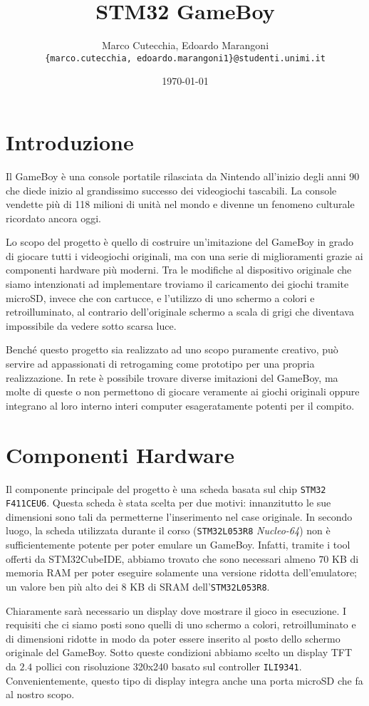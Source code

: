 \documentclass[12pt]{article}
\title{STM32 GameBoy}
\date{\today}
\author{Marco Cutecchia, Edoardo Marangoni \\
\footnotesize \texttt{\{marco.cutecchia, edoardo.marangoni1\}@studenti.unimi.it} \\ }
\begin{document}
\maketitle

\section{Introduzione}
Il GameBoy è una console portatile rilasciata da Nintendo all'inizio degli anni
90 che diede inizio al grandissimo successo dei videogiochi tascabili.
La console vendette più di 118 milioni di unità nel mondo e divenne un fenomeno
culturale ricordato ancora oggi.

Lo scopo del progetto è quello di costruire un'imitazione del GameBoy in grado
di giocare tutti i videogiochi originali, ma con una serie di miglioramenti
grazie ai componenti hardware più moderni.
Tra le modifiche al dispositivo originale che siamo intenzionati ad implementare
troviamo il caricamento dei giochi tramite microSD, invece che con cartucce,
e l'utilizzo di uno schermo a colori e retroilluminato, al contrario dell'originale
schermo a scala di grigi che diventava impossibile da vedere sotto scarsa luce.

Benché questo progetto sia realizzato ad uno scopo puramente creativo, può
servire ad appassionati di retrogaming come prototipo per una propria
realizzazione.
In rete è possibile trovare diverse imitazioni del GameBoy, ma molte di
queste o non permettono di giocare veramente ai giochi originali oppure
integrano al loro interno interi computer esageratamente potenti per il
compito.

\section{Componenti Hardware}
Il componente principale del progetto è una scheda basata sul chip
\texttt{STM32 F411CEU6}.
Questa scheda è stata scelta per due motivi: innanzitutto le sue dimensioni sono
tali da permetterne l'inserimento nel case originale.
In secondo luogo, la scheda utilizzata durante il corso
(\texttt{STM32L053R8} \textit{Nucleo-64}) non è sufficientemente potente per
poter emulare un GameBoy.
Infatti, tramite i tool offerti da STM32CubeIDE, abbiamo trovato che sono
necessari almeno $70$ KB di memoria RAM per poter eseguire solamente una versione
ridotta dell'emulatore; un valore ben più alto dei $8$ KB di SRAM
dell'\texttt{STM32L053R8}.

Chiaramente sarà necessario un display dove mostrare il gioco in esecuzione.
I requisiti che ci siamo posti sono quelli di uno schermo a colori,
retroilluminato e di dimensioni ridotte in modo da poter essere inserito
al posto dello schermo originale del GameBoy.
Sotto queste condizioni abbiamo scelto un display TFT da $2.4$ pollici con
risoluzione 320x240 basato sul controller \texttt{ILI9341}.
Convenientemente, questo tipo di display integra anche una porta microSD
che fa al nostro scopo.
\end{document}
